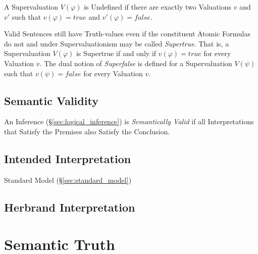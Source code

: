 A Supervaluation $V(\varphi)$ is Undefined if there are exactly two
Valuations $v$ and $v'$ such that $v(\varphi) = true$ and $v'(\varphi)
= false$.

Valid Sentences still have Truth-values even if the constituent Atomic
Formulas do not and under Supervaluationism may be called
\emph{Supertrue}. That is, a Supervaluation $V(\varphi)$ is Supertrue
if and only if $v(\varphi) = true$ for every Valuation $v$. The dual
notion of \emph{Superfalse} is defined for a Supervaluation $V(\psi)$
such that $v(\psi) = false$ for every Valuation $v$.



\subsection{Semantic Validity}\label{sec:semantic_validity}

An Inference (\S\ref{sec:logical_inference}) is \emph{Semantically
  Valid} if all Interpretations that Satisfy the Premises also Satisfy
the Conclusion. \cite{gamut91}



\subsection{Intended Interpretation}\label{sec:intended_interpretation}

Standard Model (\S\ref{sec:standard_model})



\subsection{Herbrand Interpretation}\label{sec:herbrand_interpretation}



\section{Semantic Truth}\label{sec:semantic_truth}


